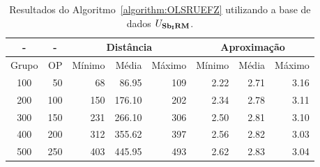 \begin{table}[!htb]
  \caption{Resultados do Algoritmo~\ref{algorithm:OLSRUEFZ} utilizando a base de dados $U_{\textbf{Sb\textsubscript{I}RM}}{}$.}
  \label{table:RQMOVGKQ}
  \centering
  \begin{tabular}{|c|r|r|r|r|r|r|r|}
    \hline
      -      & \multicolumn{1}{c|}{-} & \multicolumn{3}{c|}{Distância}             & \multicolumn{3}{c|}{Aproximação}           \\ \hline
    Grupo    & OP                     & Mínimo       & Média        & Máximo       & Mínimo       & Média        & Máximo       \\ \hline  
    100      & 50                     & 68           &  86.95       & 109          & 2.22         &         2.71 & 3.16         \\ \hline
    200      & 100                    & 150          & 176.10       & 202          & 2.34         &         2.78 & 3.11         \\ \hline
    300      & 150                    & 231          & 266.10       & 306          & 2.50         &         2.81 & 3.10         \\ \hline
    400      & 200                    & 312          & 355.62       & 397          & 2.56         &         2.82 & 3.03         \\ \hline
    500      & 250                    & 403          & 445.95       & 493          & 2.62         &         2.83 & 3.04         \\ \hline    
  \end{tabular}
\end{table}